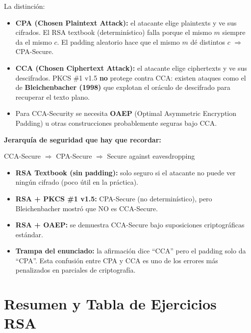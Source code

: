 \documentclass[11pt,a4paper]{article}
\begin{document}
La distinción:
\begin{itemize}
  \item \textbf{CPA (Chosen Plaintext Attack):} el atacante elige plaintexts y ve sus cifrados. El RSA textbook (determinístico) falla porque el mismo $m$ siempre da el mismo $c$. El padding aleatorio hace que el mismo $m$ dé distintos $c$ $\Rightarrow$ CPA-Secure.
  \item \textbf{CCA (Chosen Ciphertext Attack):} el atacante elige ciphertexts y ve sus descifrados. PKCS \#1 v1.5 \textbf{no} protege contra CCA: existen ataques como el de \textbf{Bleichenbacher (1998)} que explotan el oráculo de descifrado para recuperar el texto plano.
  \item Para CCA-Security se necesita \textbf{OAEP} (Optimal Asymmetric Encryption Padding) u otras construcciones probablemente seguras bajo CCA.
\end{itemize}

\begin{tipsbox}
\textbf{Jerarquía de seguridad que hay que recordar:}

\medskip
\noindent CCA-Secure $\Rightarrow$ CPA-Secure $\Rightarrow$ Secure against eavesdropping

\medskip
\begin{itemize}
  \item \textbf{RSA Textbook (sin padding):} solo seguro si el atacante no puede ver ningún cifrado (poco útil en la práctica).
  \item \textbf{RSA + PKCS \#1 v1.5:} CPA-Secure (no determinístico), pero Bleichenbacher mostró que NO es CCA-Secure.
  \item \textbf{RSA + OAEP:} se demuestra CCA-Secure bajo suposiciones criptográficas estándar.
  \item \textbf{Trampa del enunciado:} la afirmación dice ``CCA'' pero el padding solo da ``CPA''. Esta confusión entre CPA y CCA es uno de los errores más penalizados en parciales de criptografía.
\end{itemize}
\end{tipsbox}

\section{Resumen y Tabla de Ejercicios RSA}
\end{document}
